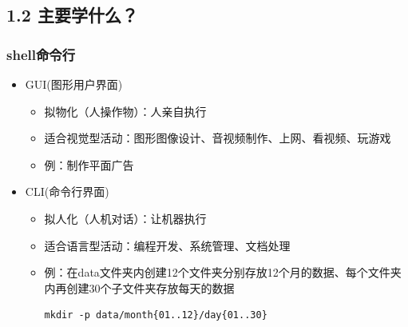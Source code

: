 \documentclass[xcolor=svgnames,bigger,presentation]{beamer}
\begin{document}
\subsection{1.2 主要学什么？}
\label{sec-1-2}
\begin{frame}[fragile]
\frametitle{shell命令行}
\label{sec-1-2-1}
\begin{itemize}

\item GUI(图形用户界面)
\label{sec-1-2-1-1}%
\begin{itemize}

\item 拟物化（人操作物）：人亲自执行
\label{sec-1-2-1-1-1}%

\item 适合视觉型活动：图形图像设计、音视频制作、上网、看视频、玩游戏
\label{sec-1-2-1-1-2}%

\item 例：制作平面广告
\label{sec-1-2-1-1-3}%
\end{itemize} %

\item CLI(命令行界面)
\label{sec-1-2-1-2}%
\begin{itemize}

\item 拟人化（人机对话）：让机器执行
\label{sec-1-2-1-2-1}%

\item 适合语言型活动：编程开发、系统管理、文档处理
\label{sec-1-2-1-2-2}%

\item 例：在data文件夹内创建12个文件夹分别存放12个月的数据、每个文件夹内再创建30个子文件夹存放每天的数据\\
\label{sec-1-2-1-2-3}%
\begin{verbatim}
mkdir -p data/month{01..12}/day{01..30}
\end{verbatim}
\end{itemize} %
\end{itemize} %
\end{frame}
\end{document}
